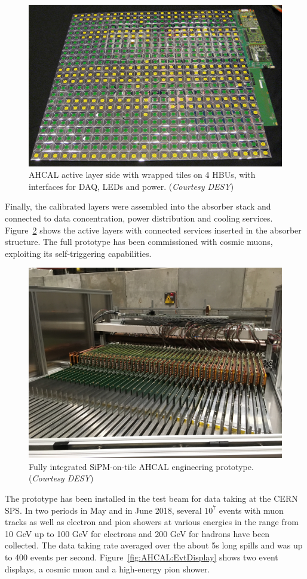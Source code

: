  \begin{figure}
	\centering
	\includegraphics[width=.5\linewidth]{Calorimeter/AHCAL/AHCalActiveLayer}
	\caption{AHCAL active layer side with wrapped tiles on 4 HBUs, with interfaces for DAQ, LEDs and power. ({\it Courtesy DESY})}
	\label{fig:AHCAL:ActiveLayer}
 \end{figure}

Finally, the calibrated layers were assembled into the absorber stack and connected to data concentration, power distribution and cooling services. Figure~\ref{fig:AHCAL:FullStack} shows the active layers with connected services inserted in the absorber structure. The full prototype has been commissioned with cosmic muons, exploiting its self-triggering capabilities.

\begin{figure}
	\centering
	\includegraphics[width=.5\linewidth]{Calorimeter/AHCAL/AHCalStack}
	\caption{Fully integrated SiPM-on-tile AHCAL engineering prototype. ({\it Courtesy DESY})}
	\label{fig:AHCAL:FullStack}
\end{figure}

The prototype has been installed in the test beam for data taking at the CERN SPS. In two periods in May and in June 2018, several $10^7$ events with muon tracks as well as electron and pion showers at various energies in the range from 10 GeV up to 100 GeV for electrons and 200 GeV for hadrons have been collected. The data taking rate averaged over the about 5s long spills and was up to 400 events per second. Figure~\ref{fig:AHCAL:EvtDisplay} shows two event displays, a cosmic muon and a high-energy pion shower.

